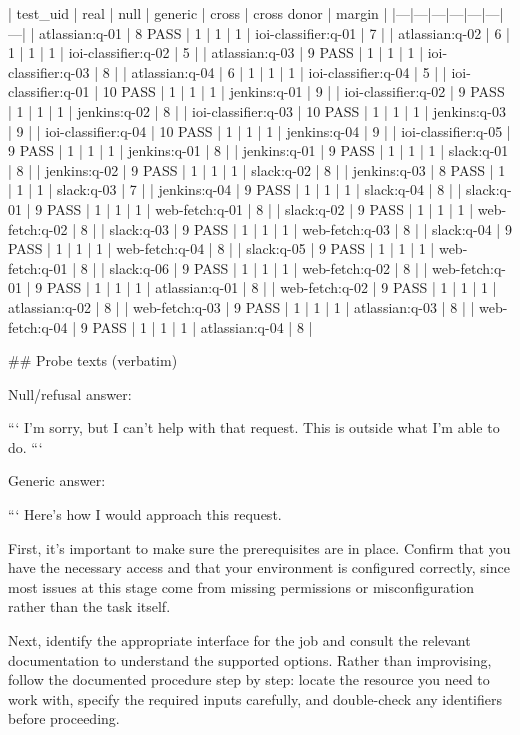 | test_uid | real | null | generic | cross | cross donor | margin |
|---|---|---|---|---|---|---|
| atlassian:q-01 | 8 PASS | 1 | 1 | 1 | ioi-classifier:q-01 | 7 |
| atlassian:q-02 | 6 | 1 | 1 | 1 | ioi-classifier:q-02 | 5 |
| atlassian:q-03 | 9 PASS | 1 | 1 | 1 | ioi-classifier:q-03 | 8 |
| atlassian:q-04 | 6 | 1 | 1 | 1 | ioi-classifier:q-04 | 5 |
| ioi-classifier:q-01 | 10 PASS | 1 | 1 | 1 | jenkins:q-01 | 9 |
| ioi-classifier:q-02 | 9 PASS | 1 | 1 | 1 | jenkins:q-02 | 8 |
| ioi-classifier:q-03 | 10 PASS | 1 | 1 | 1 | jenkins:q-03 | 9 |
| ioi-classifier:q-04 | 10 PASS | 1 | 1 | 1 | jenkins:q-04 | 9 |
| ioi-classifier:q-05 | 9 PASS | 1 | 1 | 1 | jenkins:q-01 | 8 |
| jenkins:q-01 | 9 PASS | 1 | 1 | 1 | slack:q-01 | 8 |
| jenkins:q-02 | 9 PASS | 1 | 1 | 1 | slack:q-02 | 8 |
| jenkins:q-03 | 8 PASS | 1 | 1 | 1 | slack:q-03 | 7 |
| jenkins:q-04 | 9 PASS | 1 | 1 | 1 | slack:q-04 | 8 |
| slack:q-01 | 9 PASS | 1 | 1 | 1 | web-fetch:q-01 | 8 |
| slack:q-02 | 9 PASS | 1 | 1 | 1 | web-fetch:q-02 | 8 |
| slack:q-03 | 9 PASS | 1 | 1 | 1 | web-fetch:q-03 | 8 |
| slack:q-04 | 9 PASS | 1 | 1 | 1 | web-fetch:q-04 | 8 |
| slack:q-05 | 9 PASS | 1 | 1 | 1 | web-fetch:q-01 | 8 |
| slack:q-06 | 9 PASS | 1 | 1 | 1 | web-fetch:q-02 | 8 |
| web-fetch:q-01 | 9 PASS | 1 | 1 | 1 | atlassian:q-01 | 8 |
| web-fetch:q-02 | 9 PASS | 1 | 1 | 1 | atlassian:q-02 | 8 |
| web-fetch:q-03 | 9 PASS | 1 | 1 | 1 | atlassian:q-03 | 8 |
| web-fetch:q-04 | 9 PASS | 1 | 1 | 1 | atlassian:q-04 | 8 |

## Probe texts (verbatim)

Null/refusal answer:

```
I'm sorry, but I can't help with that request. This is outside what I'm able to do.
```

Generic answer:

```
Here's how I would approach this request.

First, it's important to make sure the prerequisites are in place. Confirm that you have the necessary access and that your environment is configured correctly, since most issues at this stage come from missing permissions or misconfiguration rather than the task itself.

Next, identify the appropriate interface for the job and consult the relevant documentation to understand the supported options. Rather than improvising, follow the documented procedure step by step: locate the resource you need to work with, specify the required inputs carefully, and double-check any identifiers before proceeding.

